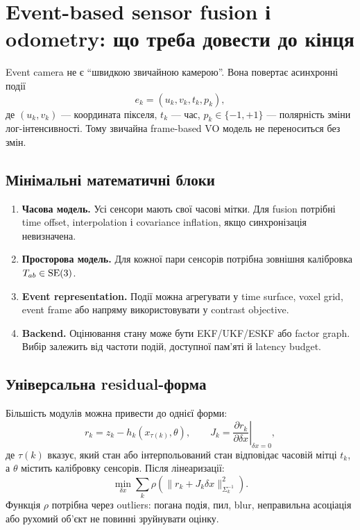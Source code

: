 \chapter{Event-based sensor fusion і odometry: що треба довести до кінця}

Event camera не є ``швидкою звичайною камерою''. Вона повертає асинхронні події
\[
  e_k=(u_k,v_k,t_k,p_k),
\]
де $(u_k,v_k)$ --- координата пікселя, $t_k$ --- час, $p_k\in\{-1,+1\}$ --- полярність зміни лог-інтенсивності. Тому звичайна frame-based VO модель не переноситься без змін.

\section*{Мінімальні математичні блоки}

\begin{enumerate}[leftmargin=2em]
\item \textbf{Часова модель.} Усі сенсори мають свої часові мітки. Для fusion потрібні time offset, interpolation і covariance inflation, якщо синхронізація невизначена.
\item \textbf{Просторова модель.} Для кожної пари сенсорів потрібна зовнішня калібровка $T_{ab}\in\mathrm{SE}(3)$.
\item \textbf{Event representation.} Події можна агрегувати у time surface, voxel grid, event frame або напряму використовувати у contrast objective.
\item \textbf{Backend.} Оцінювання стану може бути EKF/UKF/ESKF або factor graph. Вибір залежить від частоти подій, доступної пам'яті й latency budget.
\end{enumerate}

\section*{Універсальна residual-форма}

Більшість модулів можна привести до однієї форми:
\[
  r_k = z_k - h_k(x_{\tau(k)},\theta),
  \qquad
  J_k = \left.\frac{\partial r_k}{\partial \delta x}\right|_{\delta x=0},
\]
де $\tau(k)$ вказує, який стан або інтерпольований стан відповідає часовій мітці $t_k$, а $\theta$ містить калібровку сенсорів. Після лінеаризації:
\[
  \min_{\delta x}\sum_k \rho\!\left(\|r_k+J_k\delta x\|_{\Sigma_k^{-1}}^2\right).
\]
Функція $\rho$ потрібна через outliers: погана подія, пил, blur, неправильна асоціація або рухомий об'єкт не повинні зруйнувати оцінку.

